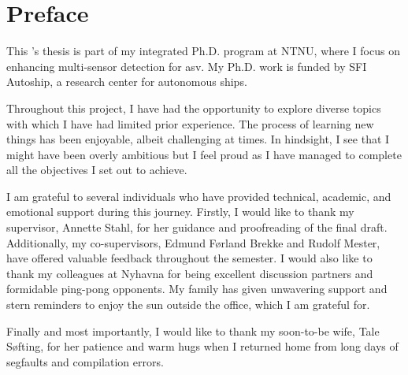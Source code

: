 \chapter*{Preface}

This \master's thesis is part of my integrated Ph.D. program at NTNU, where I focus on enhancing multi-sensor detection for \gls{asv}.
My Ph.D. work is funded by SFI Autoship, a research center for autonomous ships.

Throughout this project, I have had the opportunity to explore diverse topics with which I have had limited prior experience.
The process of learning new things has been enjoyable, albeit challenging at times.
In hindsight, I see that I might have been overly ambitious but I feel proud as I have managed to complete all the objectives I set out to achieve.

I am grateful to several individuals who have provided technical, academic, and emotional support during this journey.
Firstly, I would like to thank my supervisor, Annette Stahl, for her guidance and proofreading of the final draft.
Additionally, my co-supervisors, Edmund Førland Brekke and Rudolf Mester, have offered valuable feedback throughout the semester.
I would also like to thank my colleagues at Nyhavna for being excellent discussion partners and formidable ping-pong opponents.
My family has given unwavering support and stern reminders to enjoy the sun outside the office, which I am grateful for.

Finally and most importantly, I would like to thank my soon-to-be wife, Tale Søfting, for her patience and warm hugs when I returned home from long days of segfaults and compilation errors.




